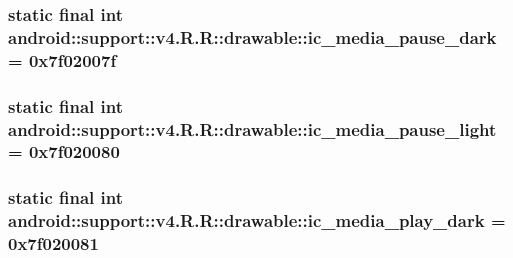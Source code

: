 \hypertarget{classandroid_1_1support_1_1v4_1_1_r_1_1drawable_dcab614e3dd7b43ee798a31838902948}{
\subsubsection[{ic\_\-media\_\-pause\_\-dark}]{\setlength{\rightskip}{0pt plus 5cm}static final int android::support::v4.R.R::drawable::ic\_\-media\_\-pause\_\-dark = 0x7f02007f}}
\label{classandroid_1_1support_1_1v4_1_1_r_1_1drawable_dcab614e3dd7b43ee798a31838902948}


\hypertarget{classandroid_1_1support_1_1v4_1_1_r_1_1drawable_8b442c77216bd8bc4e72305ab1cd69bc}{
\subsubsection[{ic\_\-media\_\-pause\_\-light}]{\setlength{\rightskip}{0pt plus 5cm}static final int android::support::v4.R.R::drawable::ic\_\-media\_\-pause\_\-light = 0x7f020080}}
\label{classandroid_1_1support_1_1v4_1_1_r_1_1drawable_8b442c77216bd8bc4e72305ab1cd69bc}


\hypertarget{classandroid_1_1support_1_1v4_1_1_r_1_1drawable_e14de5a665726d0815186213ee65c52b}{
\subsubsection[{ic\_\-media\_\-play\_\-dark}]{\setlength{\rightskip}{0pt plus 5cm}static final int android::support::v4.R.R::drawable::ic\_\-media\_\-play\_\-dark = 0x7f020081}}
\label{classandroid_1_1support_1_1v4_1_1_r_1_1drawable_e14de5a665726d0815186213ee65c52b}


